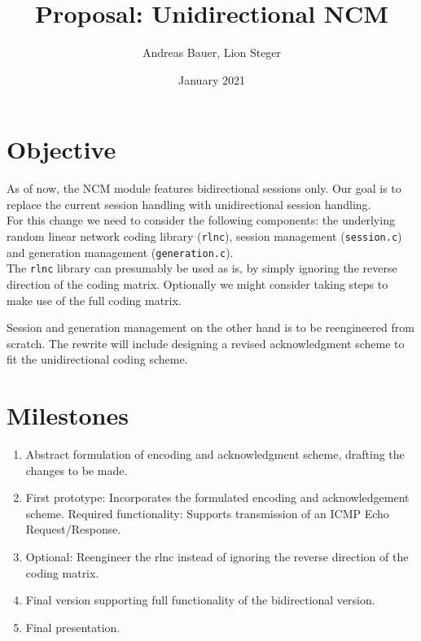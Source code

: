 \documentclass[a4paper, 11pt]{article}
\title{Proposal: Unidirectional NCM}
\author{Andreas Bauer, Lion Steger}
\date{January 2021}
\newcommand{\ilc}[1]{\texttt{#1}} %
\begin{document}
    \maketitle

    \section{Objective}\label{sec:objective}
    As of now, the NCM module features bidirectional sessions only.
    Our goal is to replace the current session handling with unidirectional session handling.
    \\

    For this change we need to consider the following components: the underlying random linear network coding library (\ilc{rlnc}),
    session management (\ilc{session.c}) and generation management (\ilc{generation.c}).
    \\

    The \ilc{rlnc} library can presumably be used as is, by simply ignoring the reverse direction of the coding matrix.
    Optionally we might consider taking steps to make use of the full coding matrix.

    Session and generation management on the other hand is to be reengineered from scratch.
    The rewrite will include designing a revised acknowledgment scheme to fit the unidirectional coding scheme.

    \section{Milestones}\label{sec:milestones}
    \begin{enumerate}
        \item Abstract formulation of encoding and acknowledgment scheme, drafting the changes to be made.
        \item First prototype: Incorporates the formulated encoding and acknowledgement scheme.
                Required functionality: Supports transmission of an ICMP Echo Request/Response.
        \item Optional: Reengineer the rlnc instead of ignoring the reverse direction of the coding matrix.
        \item Final version supporting full functionality of the bidirectional version.
        \item Final presentation.
    \end{enumerate}
\end{document}
